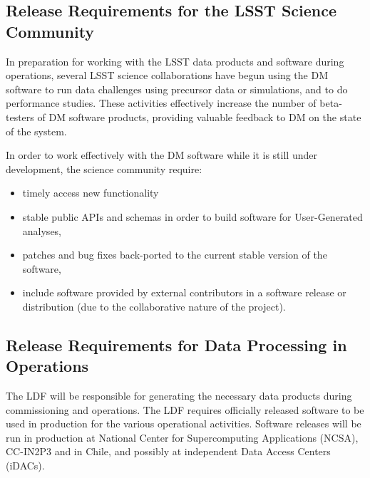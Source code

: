 \subsection{Release Requirements for the \gls{LSST} Science Community} \label{sec:comreqs}

In preparation for working with the \gls{LSST} data products and software during operations, several \gls{LSST} science collaborations have begun using the \gls{DM} software to run data challenges using precursor data or simulations, and to do performance studies. These activities effectively increase the number of beta-testers of \gls{DM} software products, providing valuable feedback to \gls{DM} on the state of the system. 

In order to work effectively with the \gls{DM} software while it is still under development, the science community require: 
\begin{itemize}
\item timely access new functionality
\item stable public APIs and schemas in order to build software for User-Generated analyses, 
\item patches and bug fixes back-ported to the current stable version of the software,
\item include software provided by external contributors in a software release or distribution (due to the collaborative nature of the project).
\end{itemize}


\subsection{Release Requirements for Data Processing in Operations} \label{sec:procreqs}

The \gls{LDF} will be responsible for generating the necessary data products during commissioning and operations. 
The \gls{LDF} requires officially released software to be used in production for the various operational activities.
Software releases will be run in production at National \gls{Center} for Supercomputing Applications (\gls{NCSA}), CC-IN2P3 and in Chile, and possibly at independent Data Access Centers (iDACs).

